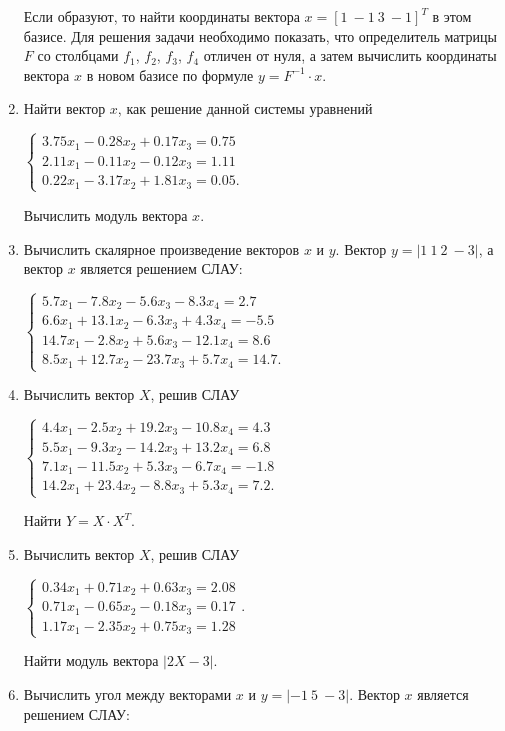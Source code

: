 \begin{enumerate}
Если образуют, то найти координаты вектора  $x=[1\ -1\ 3\ -1]^T$  в этом базисе. Для решения задачи необходимо
показать, что определитель матрицы $F$ со столбцами $f_1$, $f_2$, $f_3$, $f_4$  
отличен от нуля, а затем вычислить координаты вектора $x$ в новом базисе по формуле 
$y=F^{-1}\cdot x$.
\item Найти вектор $x$, как решение данной системы уравнений

$\left\{\begin{matrix}
3.75x_1-0.28x_2+0.17x_3=0.75\\
2.11x_1-0.11x_2-0.12x_3=1.11\\
0.22x_1-3.17x_2+1.81x_3=0.05.
\end{matrix}\right.$

Вычислить модуль вектора $x$.
\item  Вычислить скалярное произведение векторов $x$ и $y$. Вектор  $y=|1\ 1\ 2\ -3|$, а вектор
$x$ является решением СЛАУ:

$\left\{\begin{matrix}
5.7x_1-7.8x_2-5.6x_3-8.3x_4=2.7\\
6.6x_1+13.1x_2-6.3x_3+4.3x_4=-5.5\\
14.7x_1-2.8x_2+5.6x_3-12.1x_4=8.6\\
8.5x_1+12.7x_2-23.7x_3+5.7x_4=14.7.
\end{matrix}\right.$
\item Вычислить вектор $X$, решив СЛАУ

$\left\{\begin{matrix}
4.4x_1-2.5x_2+19.2x_3-10.8x_4=4.3\\
5.5x_1-9.3x_2-14.2x_3+13.2x_4=6.8\\
7.1x_1-11.5x_2+5.3x_3-6.7x_4=-1.8\\
14.2x_1+23.4x_2-8.8x_3+5.3x_4=7.2.
\end{matrix}\right.$

Найти  $Y=X\cdot X^T$.
\item Вычислить вектор $X$, решив СЛАУ

$\left\{\begin{matrix}0.34x_1+0.71x_2+0.63x_3=2.08\\0.71x_1-0.65x_2-0.18x_3=0.17\\1.17x_1-2.35x_2+0.75x_3=1.28\end{matrix}\right.$. 

Найти модуль вектора $|2X-3|$.
\item Вычислить угол между векторами $x$ и  $y=|-1\ 5\ -3|$. Вектор $x$ является решением СЛАУ:


\end{enumerate}
